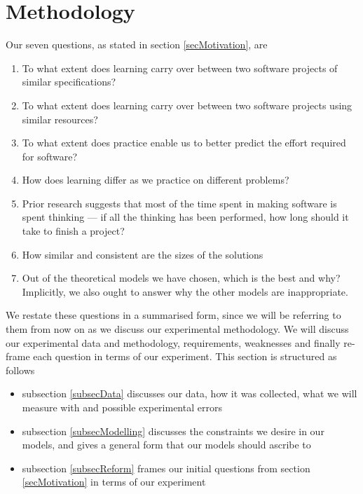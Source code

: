 \section{Methodology} \label{secMethod}

Our seven questions, as stated in section \ref{secMotivation}, are
\begin{enumerate}
  \item To what extent does learning carry over between two software projects of similar
  specifications?\label{questOne}
  \item To what extent does learning carry over between two software projects using
  similar resources?\label{questTwo}
  \item To what extent does practice enable us to better predict the effort required
  for software?\label{questThree}
  \item How does learning differ as we practice on different problems? \label{questFour}
  \item Prior research suggests that most of the time spent in making software is spent
thinking --- if all the thinking has been performed, how long should it take to
finish a project?\label{questFive}
  \item  How similar and consistent are the sizes of the solutions\label{questSix}
  \item Out of the theoretical models we have chosen, which is the best and why?
  Implicitly, we also ought to answer why the other models are inappropriate.\label{questSeven}
\end{enumerate}

We restate these questions in a summarised form, since we will be referring to
them from now on as we discuss our experimental methodology.
We will discuss our experimental data and methodology, requirements, weaknesses
and finally re-frame each question in terms of our experiment.
This section is structured as follows
\begin{itemize}
  \item subsection \ref{subsecData} discusses our data, how it was collected,
  what we will measure with and possible experimental errors
  \item subsection \ref{subsecModelling} discusses the constraints we desire in
  our models, and gives a general form that our models should ascribe to
  \item subsection \ref{subsecReform} frames our initial questions from section
  \ref{secMotivation} in terms of our experiment
\end{itemize}

